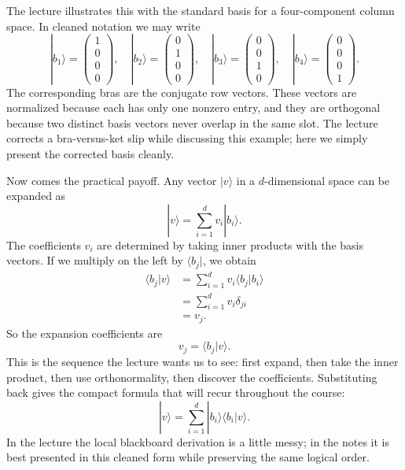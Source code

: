 The lecture illustrates this with the standard basis for a four-component column space. In cleaned notation we may write
\begin{equation}
|b_1\rangle
=
\left(
\begin{array}{c}
1\\
0\\
0\\
0
\end{array}
\right),
\quad
|b_2\rangle
=
\left(
\begin{array}{c}
0\\
1\\
0\\
0
\end{array}
\right),
\quad
|b_3\rangle
=
\left(
\begin{array}{c}
0\\
0\\
1\\
0
\end{array}
\right),
\quad
|b_4\rangle
=
\left(
\begin{array}{c}
0\\
0\\
0\\
1
\end{array}
\right).
\end{equation}
The corresponding bras are the conjugate row vectors. These vectors are normalized because each has only one nonzero entry, and they are orthogonal because two distinct basis vectors never overlap in the same slot. The lecture corrects a bra-versus-ket slip while discussing this example; here we simply present the corrected basis cleanly.

Now comes the practical payoff. Any vector \(|v\rangle\) in a \(d\)-dimensional space can be expanded as
\begin{equation}
|v\rangle = \sum_{i=1}^d v_i |b_i\rangle.
\end{equation}
The coefficients \(v_i\) are determined by taking inner products with the basis vectors. If we multiply on the left by \(\langle b_j|\), we obtain
\begin{align}
\langle b_j|v\rangle
&=
\sum_{i=1}^d v_i \langle b_j|b_i\rangle \\
&=
\sum_{i=1}^d v_i \delta_{ji} \\
&=
v_j.
\end{align}
So the expansion coefficients are
\begin{equation}
v_j = \langle b_j|v\rangle.
\end{equation}
This is the sequence the lecture wants us to see: first expand, then take the inner product, then use orthonormality, then discover the coefficients. Substituting back gives the compact formula that will recur throughout the course:
\begin{equation}
|v\rangle = \sum_{i=1}^d |b_i\rangle \langle b_i|v\rangle.
\end{equation}
In the lecture the local blackboard derivation is a little messy; in the notes it is best presented in this cleaned form while preserving the same logical order.

